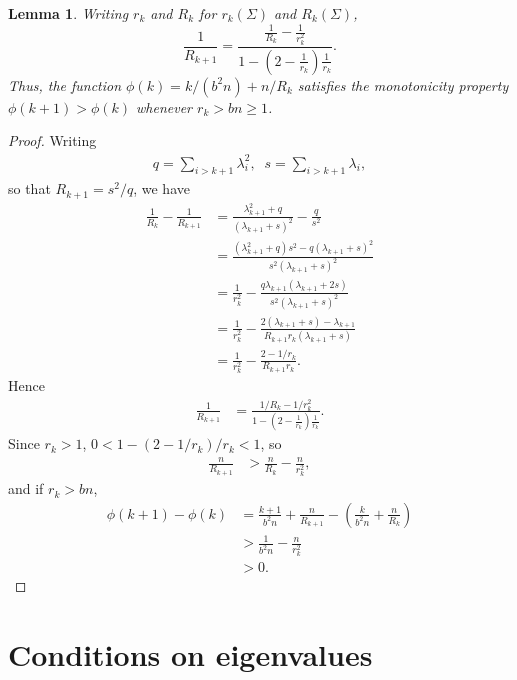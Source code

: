\documentclass[11pt,notitlepage]{article}
\newtheorem{lemma}[theorem]{Lemma}
\begin{document}
\begin{lemma}\label{lemma:monotonicbound}
Writing $r_k$ and $R_k$ for $r_k(\Sigma)$ and $R_k(\Sigma)$,
  \[
    \frac{1}{R_{k+1}} = \frac{\frac{1}{R_k}-\frac{1}{r_k^2}}
      {1-\left(2-\frac{1}{r_k}\right)\frac{1}{r_k}}.
  \]
  Thus, the function $\phi(k)= k/(b^2n) + n/R_k$
  satisfies the monotonicity property $\phi(k+1)>\phi(k)$ whenever
  $r_k>bn\ge 1$.
\end{lemma}

\begin{proof}
Writing
  \begin{align*}
    q = \sum_{i>k+1}\lambda_i^2,\;\; s = \sum_{i>k+1}\lambda_i,
  \end{align*}
so that $R_{k+1}=s^2/q$, we have
  \begin{align*}
      \frac{1}{R_k} - \frac{1}{R_{k+1}}
        & = \frac{\lambda_{k+1}^2 +q}{\left(\lambda_{k+1}+s\right)^2}
          - \frac{q}{s^2} \\
        & = \frac{\left(\lambda_{k+1}^2 +q\right)s^2 - q\left(\lambda_{k+1}+s\right)^2}
          {s^2\left(\lambda_{k+1}+s\right)^2} \\
        & = \frac{1}{r_k^2} - \frac{q\lambda_{k+1}\left(\lambda_{k+1}+2s\right)}
          {s^2\left(\lambda_{k+1}+s\right)^2} \\
        & = \frac{1}{r_k^2} - \frac{2\left(\lambda_{k+1}+s\right)-\lambda_{k+1}}
          {R_{k+1}r_k \left(\lambda_{k+1}+s\right)} \\
        & = \frac{1}{r_k^2} - \frac{2-1/r_k}{R_{k+1}r_k}.
  \end{align*}
Hence
  \begin{align*}
    \frac{1}{R_{k+1}}
      & = \frac{1/R_k - 1/r_k^2}
        {1-\left(2-\frac{1}{r_k}\right)\frac{1}{r_k}}.
  \end{align*}
Since
$r_k>1$, $0<1-\left(2-1/r_k\right)/r_k<1$, so
  \begin{align*}
      \frac{n}{R_{k+1}}
        & > \frac{n}{R_k} - \frac{n}{r^2_k},
  \end{align*}
and if $r_k>bn$,
  \begin{align*}
    \phi(k+1)-\phi(k)
      & = \frac{k+1}{b^2n} + \frac{n}{R_{k+1}}
        - \left(\frac{k}{b^2n} + \frac{n}{R_k}\right) \\
      & > \frac{1}{b^2n} - \frac{n}{r^2_k}\\
      & >0.
  \end{align*}
\end{proof}

\section{Conditions on eigenvalues}\label{section:eigenproof}
\end{document}
